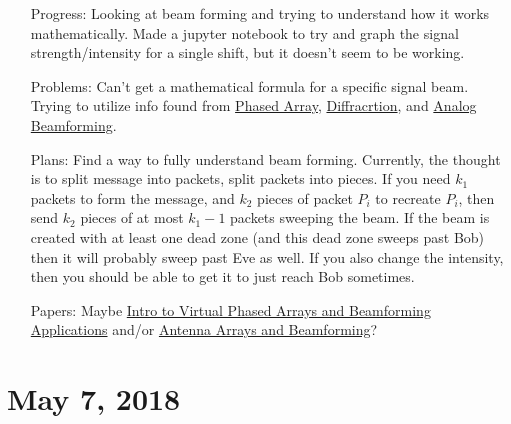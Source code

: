 \documentclass[11pt]{article}
\begin{document}
\begin{itemize}
\item[Progress:]
Looking at beam forming and trying to understand how it works mathematically.  Made a jupyter notebook to try and graph the signal strength/intensity for a single shift, but it doesn't seem to be working.

\item[Problems:]
Can't get a mathematical formula for a specific signal beam.  Trying to utilize info found from \href{https://en.wikipedia.org/wiki/Phased_array}{Phased Array}, \href{https://en.wikipedia.org/wiki/Diffraction}{Diffracrtion}, and \href{https://www.youtube.com/watch?v=l4OwU1p8_tE}{Analog Beamforming}.

\item[Plans:]
Find a way to fully understand beam forming.
Currently, the thought is to split message into packets, split packets into pieces.  If you need $k_{1}$ packets to form the message, and $k_{2}$ pieces of packet $P_{i}$ to recreate $P_{i}$, then send $k_{2}$ pieces of at most $k_{1}-1$ packets sweeping the beam.  If the beam is created with at least one dead zone (and this dead zone sweeps past Bob) then it will probably sweep past Eve as well.  If you also change the intensity, then you should be able to get it to just reach Bob sometimes.

\item[Papers:]
Maybe \href{https://yadda.icm.edu.pl/baztech/element/bwmeta1.element.baztech-6a460c56-d9ca-40b1-94fd-236984310580/c/Comesana_1-2014.pdf}{Intro to Virtual Phased Arrays and Beamforming Applications} and/or \href{https://vtechworks.lib.vt.edu/bitstream/handle/10919/27291/ch3.pdf}{Antenna Arrays and Beamforming}?

\end{itemize}

\section{May 7, 2018}
\end{document}
